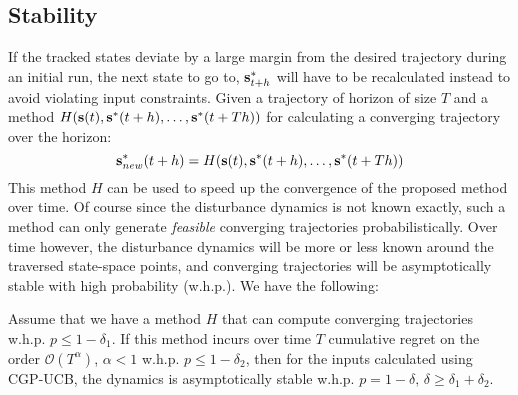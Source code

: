 \subsection{Stability}
\label{stability}
If the tracked states deviate by a large margin from the desired trajectory during an initial run, the next state to go to, $\mathbf{s}^{*}_{t+h}$ will have to be recalculated instead to avoid violating input constraints. Given a trajectory of horizon of size $T$ and a method $H(\mathbf{s}(t), \mathbf{s}^{*}(t+h), \ldots, \mathbf{s}^{*}(t+Th))$ for calculating a converging trajectory over the horizon:
\begin{equation}
\mathbf{s}^{*}_{new}(t+h) = H(\mathbf{s}(t), \mathbf{s}^{*}(t+h), \ldots, \mathbf{s}^{*}(t+Th)) \label{converging_trj} \\
\end{equation}
This method $H$ can be used to speed up the convergence of the proposed method over time. 
Of course since the disturbance dynamics is not known exactly, such a method can only generate \emph{feasible} converging trajectories probabilistically. Over time however, the disturbance dynamics will be more or less known around the traversed state-space points, and converging trajectories will be asymptotically stable with high probability (w.h.p.). We have the following:

\begin{proposition}[Stability]
Assume that we have a method $H$ that can compute converging trajectories w.h.p. $p \leq 1 - \delta_{1}$. If this method incurs over time $T$ cumulative regret on the order $\mathcal{O}(T^{\alpha})$, $\alpha < 1$ w.h.p. $p \leq 1 - \delta_{2}$, then for the inputs calculated using CGP-UCB, the dynamics is asymptotically stable w.h.p. $p = 1 - \delta, \, \delta \geq \delta_{1} + \delta_{2}$.
\label{Prop:1}
\end{proposition}

